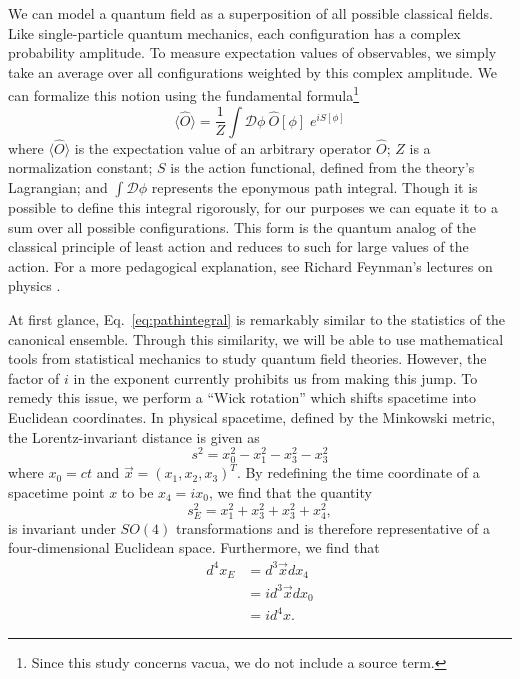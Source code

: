 We can model a quantum field as a superposition of all possible classical fields. Like single-particle quantum mechanics, each configuration has a complex probability amplitude. To measure expectation values of observables, we simply take an average over all configurations weighted by this complex amplitude. We can formalize this notion using the fundamental formula\footnote{Since this study concerns vacua, we do not include a source term.}
\begin{equation}
    \label{eq:pathintegral}
    \langle \hat O \rangle = \frac{1}{Z} \int \mathcal{D}\phi \: \hat O [\phi]\; e^{iS[\phi]}
\end{equation}
where $\langle \hat O \rangle$ is the expectation value of an arbitrary operator $\hat O$; $Z$ is a normalization constant; $S$ is the action functional, defined from the theory's Lagrangian; and $\int \mathcal{D}\phi$ represents the eponymous path integral. Though it is possible to define this integral rigorously, for our purposes we can equate it to a sum over all possible configurations. This form is the quantum analog of the classical principle of least action and reduces to such for large values of the action. For a more pedagogical explanation, see Richard Feynman's lectures on physics \cite{feynman1963a}.

At first glance, Eq.~\ref{eq:pathintegral} is remarkably similar to the statistics of the canonical ensemble. Through this similarity, we will be able to use mathematical tools from statistical mechanics to study quantum field theories. However, the factor of $i$ in the exponent currently prohibits us from making this jump. To remedy this issue, we perform a ``Wick rotation'' which shifts spacetime into Euclidean coordinates. In physical spacetime, defined by the Minkowski metric, the Lorentz-invariant distance is given as
\begin{equation}
    s^2 = x^2_0 - x^2_1- x^2_3- x^2_3
\end{equation}
where $x_0=ct$ and $\vec{x} = (x_1, x_2, x_3)^T$. By redefining the time coordinate of a spacetime point $x$ to be $x_4=ix_0$, we find that the quantity
\begin{equation}
    s_E^2 = x^2_1+ x^2_3+ x^2_3 + x^2_4,
\end{equation}
is invariant under $SO(4)$ transformations and is therefore representative of a four-dimensional Euclidean space. Furthermore, we find that
\begin{align}
    d^4x_E &= d^3\vec{x}dx_4\nonumber \\
    &= i d^3\vec{x}dx_0 \nonumber \\
    &= i d^4x. \label{eq:wickdifferential} 
\end{align}

